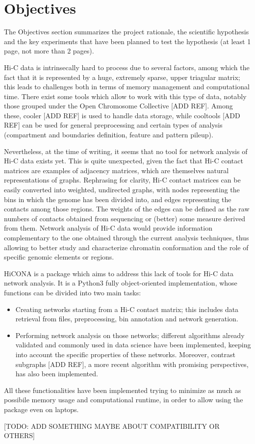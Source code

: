 \graphicspath{{chapters/03_objectives/}}
\chapter{Objectives}

The Objectives section summarizes the project rationale, the scientific hypothesis and the
key experiments that have been planned to test the hypothesis (at least 1 page, not more than
2 pages).

Hi-C data is intrinsecally hard to process due to several factors, among which the fact that it is represented by a huge, extremely sparse, upper triagular matrix; this leads to challenges both in terms of memory management and computational time. There exist some tools which allow to work with this type of data, notably those grouped under the Open Chromosome Collective [ADD REF]. Among these, cooler [ADD REF] is used to handle data storage, while cooltools [ADD REF] can be used for general preprocessing and certain types of analysis (compartment and boundaries definition, feature and pattern pileup). 

Nevertheless, at the time of writing, it seems that no tool for network analysis of Hi-C data exists yet. This is quite unexpected, given the fact that Hi-C contact matrices are examples of adjacency matrices, which are themselves natural representations of graphs. Rephrasing for clarity, Hi-C contact matrices can be easily converted into weighted, undirected graphs, with nodes representing the bins in which the genome has been divided into, and edges representing the contacts among those regions. The weights of the edges can be defined as the raw numbers of contacts obtained from sequencing or (better) some measure derived from them. Network analysis of Hi-C data would provide information complementary to the one obtained through the current analysis techniques, thus allowing to better study and characterize chromatin conformation and the role of specific genomic elements or regions. 

HiCONA is a package which aims to address this lack of tools for Hi-C data network analysis. It is a Python3 fully object-oriented implementation, whose functions can be divided into two main tasks:
\begin{itemize}\tightlist
  \item Creating networks starting from a Hi-C contact matrix; this includes data retrieval from files, preprocessing, bin annotation and network generation.
  \item Performing network analysis on those networks; different algorithms already validated and commonly used in data science have been implemented, keeping into account the specific properties of these networks. Moreover, contrast subgraphs [ADD REF], a more recent algorithm with promising perspectives, has also been implemented.
\end{itemize}

All these functionalities have been implemented trying to minimize as much as possibile memory usage and computational runtime, in order to allow using the package even on laptops.

[TODO: ADD SOMETHING MAYBE ABOUT COMPATIBILITY OR OTHERS]
